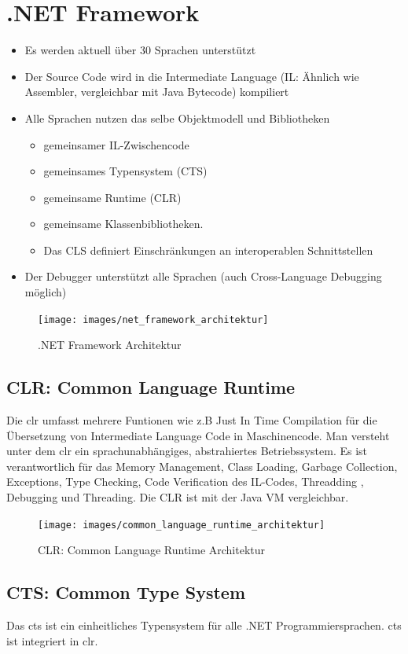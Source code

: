 \section{.NET Framework}
\begin{itemize}
	\item Es werden aktuell über 30 Sprachen unterstützt
	\item Der Source Code wird in die Intermediate Language  (IL: Ähnlich wie Assembler, vergleichbar mit Java Bytecode) kompiliert
	\item Alle Sprachen nutzen das selbe Objektmodell und Bibliotheken
	\begin{itemize}
		\item gemeinsamer IL-Zwischencode
		\item gemeinsames Typensystem (CTS)
		\item gemeinsame Runtime (CLR)
		\item gemeinsame Klassenbibliotheken.
		\item Das CLS definiert Einschränkungen an interoperablen Schnittstellen
	\end{itemize}
	\item Der Debugger unterstützt alle Sprachen (auch Cross-Language Debugging möglich)
\end{itemize}
\begin{figure}[h]
\centering
\texttt{[image: images/net\_framework\_architektur]}
\caption{.NET Framework Architektur}
\label{fig:netframeworkarchitektur}
\end{figure}

\subsection{CLR: Common Language Runtime}
Die \gls{clr} umfasst mehrere Funtionen wie z.B Just In Time Compilation für die Übersetzung von Intermediate Language Code in Maschinencode. Man versteht unter dem \gls{clr} ein sprachunabhängiges, abstrahiertes Betriebssystem. Es ist verantwortlich für das Memory Management, Class Loading, Garbage Collection, Exceptions, Type Checking, Code Verification des IL-Codes, Threadding
, Debugging und Threading. Die CLR ist mit der Java VM vergleichbar.
\begin{figure}[h]
\centering
\texttt{[image: images/common\_language\_runtime\_architektur]}
\caption{CLR: Common Language Runtime Architektur}
\label{fig:commonlanguageruntimearchitektur}
\end{figure}

\subsection{CTS: Common Type System}
Das \gls{cts} ist ein einheitliches Typensystem für alle .NET Programmiersprachen. \gls{cts} ist integriert in \gls{clr}. 

